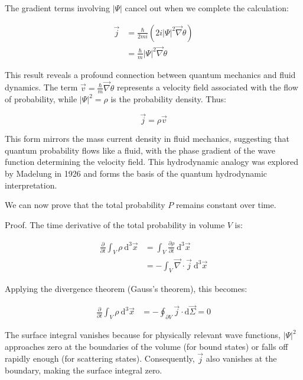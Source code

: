 \documentclass[italian]{HKNdocument}
\begin{document}
The gradient terms involving $|\Psi|$ cancel out when we complete the calculation:

\begin{align}
\vec{j} &= \frac{\hbar}{2 m i}\left(2 i|\Psi|^{2} \vec{\nabla} \theta\right) \\
&= \frac{\hbar}{m}|\Psi|^{2} \vec{\nabla} \theta
\end{align}

This result reveals a profound connection between quantum mechanics and fluid dynamics. The term $\vec{v}=\frac{\hbar}{m} \vec{\nabla} \theta$ represents a velocity field associated with the flow of probability, while $|\Psi|^2 = \rho$ is the probability density. Thus:

\begin{equation}
\vec{j}=\rho \vec{v} \label{eq:1.36}
\end{equation}

This form mirrors the mass current density in fluid mechanics, suggesting that quantum probability flows like a fluid, with the phase gradient of the wave function determining the velocity field. This hydrodynamic analogy was explored by Madelung in 1926 and forms the basis of the quantum hydrodynamic interpretation.

We can now prove that the total probability $P$ remains constant over time.

Proof. The time derivative of the total probability in volume $V$ is:

\begin{align}
\frac{\partial}{\partial t} \int_{V} \rho \mathrm{~d}^{3} \vec{x} &= \int_{V} \frac{\partial \rho}{\partial t} \mathrm{~d}^{3} \vec{x} \label{eq:1.37} \\
&= -\int_{V} \vec{\nabla} \cdot \vec{j} \mathrm{~d}^{3} \vec{x}
\end{align}

Applying the divergence theorem (Gauss's theorem), this becomes:

\begin{align}
\frac{\partial}{\partial t} \int_{V} \rho \mathrm{~d}^{3} \vec{x} &= -\oint_{\partial V} \vec{j} \cdot \mathrm{d} \vec{\Sigma} = 0
\end{align}

The surface integral vanishes because for physically relevant wave functions, $|\Psi|^2$ approaches zero at the boundaries of the volume (for bound states) or falls off rapidly enough (for scattering states). Consequently, $\vec{j}$ also vanishes at the boundary, making the surface integral zero.
\end{document}
